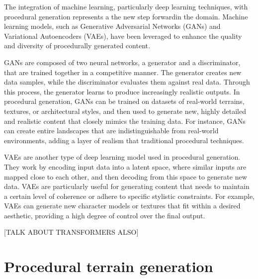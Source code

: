 The integration of machine learning, particularly deep learning techniques, with procedural generation represents a the new step forwardin the domain. Machine learning models, such as Generative Adversarial Networks (GANs) and Variational Autoencoders (VAEs), have been leveraged to enhance the quality and diversity of procedurally generated content.

GANs are composed of two neural networks, a generator and a discriminator, that are trained together in a competitive manner. The generator creates new data samples, while the discriminator evaluates them against real data. Through this process, the generator learns to produce increasingly realistic outputs. In procedural generation, GANs can be trained on datasets of real-world terrains, textures, or architectural styles, and then used to generate new, highly detailed and realistic content that closely mimics the training data. For instance, GANs can create entire landscapes that are indistinguishable from real-world environments, adding a layer of realism that traditional procedural techniques.

VAEs are another type of deep learning model used in procedural generation. They work by encoding input data into a latent space, where similar inputs are mapped close to each other, and then decoding from this space to generate new data. VAEs are particularly useful for generating content that needs to maintain a certain level of coherence or adhere to specific stylistic constraints. For example, VAEs can generate new character models or textures that fit within a desired aesthetic, providing a high degree of control over the final output.

[TALK ABOUT TRANSFORMERS ALSO]





\section{Procedural terrain generation}




